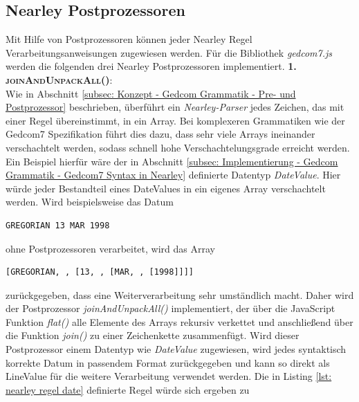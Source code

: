 \subsection{Nearley Postprozessoren}
\label{subsec: Implementierung - Gedcom Grammatik - Nearley Postprozessoren}
 Mit Hilfe von Postprozessoren können jeder Nearley Regel Verarbeitungsanweisungen zugewiesen werden. Für die Bibliothek \textit{gedcom7.js} werden die folgenden drei Nearley Postprozessoren implementiert.
\newpage
\textsc{\textbf{1. joinAndUnpackAll()}:} \vspace{0.5em} \\
Wie in Abschnitt \ref{subsec: Konzept - Gedcom Grammatik - Pre- und Postprozessor} beschrieben, überführt ein \textit{Nearley-Parser} jedes Zeichen, das mit einer Regel übereinstimmt, in ein Array. Bei komplexeren Grammatiken wie der Gedcom7 Spezifikation führt dies dazu, dass sehr viele Arrays ineinander verschachtelt werden, sodass schnell hohe Verschachtelungsgrade erreicht werden. Ein Beispiel hierfür wäre der in Abschnitt \ref{subsec: Implementierung - Gedcom Grammatik - Gedcom7 Syntax in Nearley} definierte Datentyp \textit{DateValue}. Hier würde jeder Bestandteil eines DateValues in ein eigenes Array verschachtelt werden. Wird beispielsweise das Datum 
\begin{lstlisting}[frame=none]
			 	GREGORIAN 13 MAR 1998
\end{lstlisting}
ohne Postprozessoren verarbeitet, wird das Array
\begin{lstlisting}[frame=none]
		[GREGORIAN, , [13, , [MAR, , [1998]]]]
\end{lstlisting}
zurückgegeben, dass eine Weiterverarbeitung sehr umständlich macht. Daher wird der Postprozessor \textit{joinAndUnpackAll()} implementiert, der über die JavaScript Funktion \textit{flat()} alle Elemente des Arrays rekursiv verkettet und anschließend über die Funktion \textit{join()} zu einer Zeichenkette zusammenfügt. Wird dieser Postprozessor einem Datentyp wie \textit{DateValue} zugewiesen, wird jedes syntaktisch korrekte Datum in passendem Format zurückgegeben und kann so direkt als LineValue für die weitere Verarbeitung verwendet werden. Die in Listing \ref{lst: nearley regel date} definierte Regel würde sich ergeben zu
\vspace{1em}
\vspace{1em}

